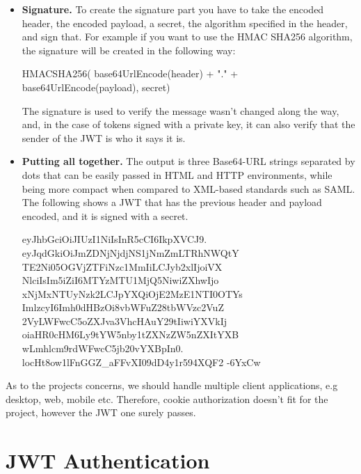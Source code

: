\begin{itemize}
    \begin{spverbatim}
    {
        "sub": "1234567890",
        "name": "John Doe",
        "admin": true
    }
    \end{spverbatim}

    The payload is then Base64Url encoded to form the second part of the JSON Web Token.
    Do note that for signed tokens this information, though protected against tampering, is readable by anyone.
    Do not put secret information in the payload or header elements of a JWT unless it is encrypted.
    \item \textbf{Signature.} To create the signature part you have to take the encoded header, the encoded payload, a secret,
    the algorithm specified in the header, and sign that.
    For example if you want to use the HMAC SHA256 algorithm, the signature will be created in the following way:

    \begin{spverbatim}
        HMACSHA256(
        base64UrlEncode(header) + "." +
        base64UrlEncode(payload),
        secret)
    \end{spverbatim}

    The signature is used to verify the message wasn't changed along the way, and, in the case of tokens signed
    with a private key, it can also verify that the sender of the JWT is who it says it is.
    \item \textbf{Putting all together.} The output is three Base64-URL strings separated by dots that can be easily
    passed in HTML and HTTP environments, while being more compact when compared to XML-based standards such as SAML\@.
    The following shows a JWT that has the previous header and payload encoded, and it is signed with a secret.
    
    \begin{spverbatim}
        eyJhbGciOiJIUzI1NiIsInR5cCI6IkpXVCJ9.
        eyJqdGkiOiJmZDNjNjdjNS1jNmZmLTRhNWQtY
        TE2Ni05OGVjZTFiNzc1MmIiLCJyb2xlIjoiVX
        NlciIsIm5iZiI6MTYzMTU1MjQ5NiwiZXhwIjo
        xNjMxNTUyNzk2LCJpYXQiOjE2MzE1NTI0OTYs
        ImlzcyI6Imh0dHBzOi8vbWFuZ28tbWVzc2VuZ
        2VyLWFwcC5oZXJva3VhcHAuY29tIiwiYXVkIj
        oiaHR0cHM6Ly9tYW5nby1tZXNzZW5nZXItYXB
        wLmhlcm9rdWFwcC5jb20vYXBpIn0.
        locHt8ow1lFnGGZ_aFFvXI09dD4y1r594XQF2
        -6YxCw
    \end{spverbatim}
    
\end{itemize}

As to the projects concerns, we should handle multiple client applications, e.g desktop,
web, mobile etc.
Therefore, cookie authorization doesn't fit for the project, however the JWT one surely passes.


\section{JWT Authentication}\label{sec:jwt-authentication}
